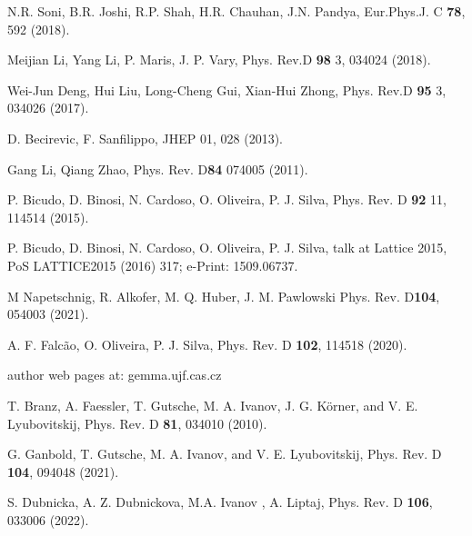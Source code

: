 \documentclass[aps,prd,superscriptaddress,eqsecnum,amsfonts,showpacs,epsfig]{revtex4}
\begin{document}
\begin{thebibliography}{00}
N.R. Soni, B.R. Joshi, R.P. Shah, H.R. Chauhan, J.N. Pandya,
Eur.Phys.J. C {\bf 78},  592 (2018).

Meijian Li, Yang Li, P. Maris, J. P. Vary, Phys. Rev.D {\bf  98} 3, 034024 (2018).

Wei-Jun Deng, Hui Liu, Long-Cheng Gui, Xian-Hui Zhong, Phys. Rev.D {\bf  95}  3, 034026 (2017).
    
D. Becirevic, F. Sanfilippo, JHEP 01, 028 (2013).
 
Gang Li, Qiang Zhao,   Phys. Rev. D{\bf  84}  074005 (2011).  
 
 P. Bicudo, D. Binosi, N. Cardoso, O. Oliveira, P. J. Silva,  Phys. Rev. D {\bf 92} 11, 114514 (2015).

 P. Bicudo, D. Binosi, N. Cardoso, O. Oliveira, P. J. Silva, talk at  Lattice 2015,        PoS LATTICE2015 (2016) 317;  e-Print: 1509.06737.

M Napetschnig, R. Alkofer, M. Q. Huber, J. M. Pawlowski Phys. Rev. D{\bf  104}, 054003 (2021). 

 A. F. Falcão, O. Oliveira, P. J. Silva, Phys. Rev. D {\bf 102}, 114518 (2020). 

author web pages at: gemma.ujf.cas.cz

T. Branz, A. Faessler, T. Gutsche, M. A. Ivanov, J. G. Körner, and V. E. Lyubovitskij, Phys. Rev. D {\bf 81}, 034010 (2010).

G. Ganbold, T. Gutsche, M. A. Ivanov, and V. E. Lyubovitskij, Phys. Rev. D {\bf 104}, 094048 (2021).

S. Dubnicka, A. Z. Dubnickova, M.A. Ivanov , A. Liptaj, Phys. Rev. D {\bf 106}, 033006 (2022).


\end{thebibliography}
\end{document}

